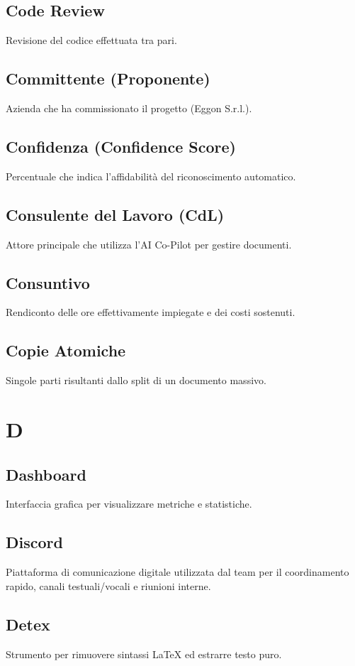 \documentclass[a4paper,12pt]{article}
\begin{document}
\subsection{Code Review}
Revisione del codice effettuata tra pari.


\subsection{Committente (Proponente)}
Azienda che ha commissionato il progetto (Eggon S.r.l.).

\subsection{Confidenza (Confidence Score)}
Percentuale che indica l'affidabilità del riconoscimento automatico.

\subsection{Consulente del Lavoro (CdL)}
Attore principale che utilizza l'AI Co-Pilot per gestire documenti.

\subsection{Consuntivo}
Rendiconto delle ore effettivamente impiegate e dei costi sostenuti.

\subsection{Copie Atomiche}
Singole parti risultanti dallo split di un documento massivo.


\section{D}
\subsection{Dashboard}
Interfaccia grafica per visualizzare metriche e statistiche.

\subsection{Discord}
Piattaforma di comunicazione digitale utilizzata dal team per il coordinamento rapido, canali testuali/vocali e riunioni interne.

\subsection{Detex}
Strumento per rimuovere sintassi LaTeX ed estrarre testo puro.
\end{document}
